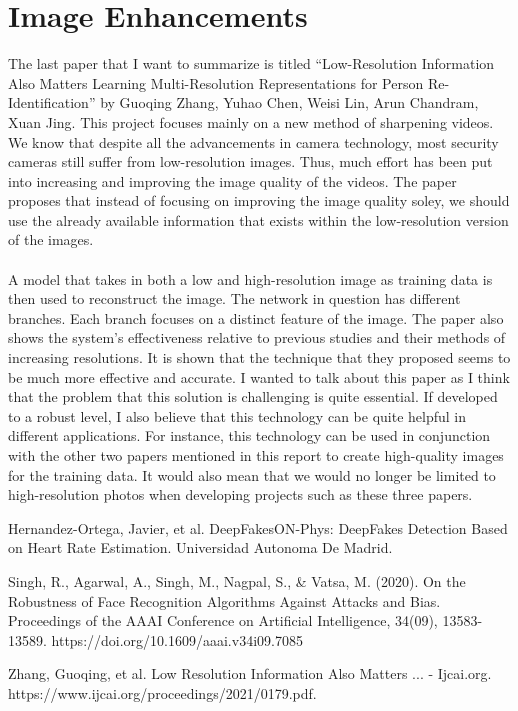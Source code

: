 \documentclass[12pt,journal,compsoc]{IEEEtran}
\begin{document}
\section{Image Enhancements}
The last paper that I want to summarize is titled “Low-Resolution Information Also Matters Learning Multi-Resolution Representations for Person Re-Identification” by Guoqing Zhang, Yuhao Chen, Weisi Lin, Arun Chandram, Xuan Jing. This project focuses mainly on a new method of sharpening videos. We know that despite all the advancements in camera technology, most security cameras still suffer from low-resolution images. Thus, much effort has been put into increasing and improving the image quality of the videos. The paper proposes that instead of focusing on improving the image quality soley, we should use the already available information that exists within the low-resolution version of the images.\\\\
A model that takes in both a low and high-resolution image as training data is then used to reconstruct the image. The network in question has different branches. Each branch focuses on a distinct feature of the image. The paper also shows the system's effectiveness relative to previous studies and their methods of increasing resolutions. It is shown that the technique that they proposed seems to be much more effective and accurate. I wanted to talk about this paper as I think that the problem that this solution is challenging is quite essential. If developed to a robust level, I also believe that this technology can be quite helpful in different applications. For instance, this technology can be used in conjunction with the other two papers mentioned in this report to create high-quality images for the training data. It would also mean that we would no longer be limited to high-resolution photos when developing projects such as these three papers.
\newpage
\begin{thebibliography}{1}

Hernandez-Ortega, Javier, et al. DeepFakesON-Phys: DeepFakes Detection Based on Heart Rate Estimation. Universidad Autonoma De Madrid. 

Singh, R., Agarwal, A., Singh, M., Nagpal, S., \& Vatsa, M. (2020). On the Robustness of Face Recognition Algorithms Against Attacks and Bias. Proceedings of the AAAI Conference on Artificial Intelligence, 34(09), 13583-13589. https://doi.org/10.1609/aaai.v34i09.7085

Zhang, Guoqing, et al. Low Resolution Information Also Matters ... - Ijcai.org. https://www.ijcai.org/proceedings/2021/0179.pdf. 

\end{thebibliography}
\end{document}
